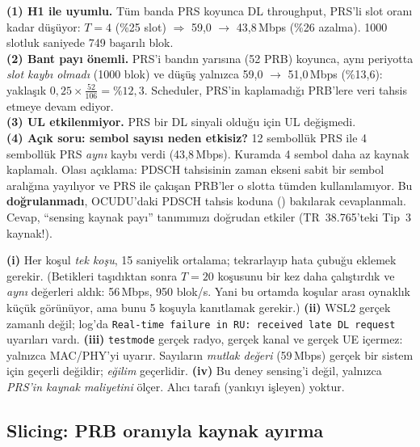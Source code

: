 \begin{bulgu}
\textbf{(1) H1 ile uyumlu.} Tüm banda PRS koyunca DL throughput, PRS'li slot oranı kadar düşüyor: $T=4$ (\%25 slot) $\Rightarrow$ 59,0 $\rightarrow$ 43,8\,Mbps (\%26 azalma). 1000 slotluk saniyede 749 başarılı blok.\\
\textbf{(2) Bant payı önemli.} PRS'i bandın yarısına (52 PRB) koyunca, aynı periyotta \emph{slot kaybı olmadı} (1000 blok) ve düşüş yalnızca 59,0 $\rightarrow$ 51,0\,Mbps (\%13,6): yaklaşık $0{,}25\times\frac{52}{106}=\%12{,}3$. Scheduler, PRS'in kaplamadığı PRB'lere veri tahsis etmeye devam ediyor.\\
\textbf{(3) UL etkilenmiyor.} PRS bir DL sinyali olduğu için UL değişmedi.\\
\textbf{(4) Açık soru: sembol sayısı neden etkisiz?} 12 sembollük PRS ile 4 sembollük PRS \emph{aynı} kaybı verdi (43,8\,Mbps). Kuramda 4 sembol daha az kaynak kaplamalı. Olası açıklama:
PDSCH tahsisinin zaman ekseni sabit bir sembol aralığına yayılıyor ve PRS ile çakışan PRB'ler o slotta tümden kullanılamıyor. Bu \textbf{doğrulanmadı}, OCUDU'daki PDSCH tahsis koduna () bakılarak cevaplanmalı.
Cevap, ``sensing kaynak payı'' tanımımızı doğrudan etkiler (TR~38.765'teki Tip~3 kaynak!).
\end{bulgu}

\begin{dikkat}
\textbf{(i)} Her koşul \emph{tek koşu}, 15 saniyelik ortalama; tekrarlayıp hata çubuğu eklemek gerekir. (Betikleri taşıdıktan sonra $T=20$ koşusunu bir kez daha çalıştırdık ve \emph{aynı} değerleri aldık: 56\,Mbps, 950 blok/s. Yani bu ortamda koşular arası oynaklık küçük görünüyor, ama bunu 5 koşuyla kanıtlamak gerekir.) \textbf{(ii)} WSL2 gerçek zamanlı değil; log'da \texttt{Real-time failure in RU: received late DL request} uyarıları vardı.
\textbf{(iii)} \texttt{testmode} gerçek radyo, gerçek kanal ve gerçek UE içermez: yalnızca MAC/PHY'yi uyarır. Sayıların \emph{mutlak değeri} (59\,Mbps) gerçek bir sistem için geçerli değildir; \emph{eğilim} geçerlidir.
\textbf{(iv)} Bu deney sensing'i değil, yalnızca \emph{PRS'in kaynak maliyetini} ölçer. Alıcı tarafı (yankıyı işleyen) yoktur.
\end{dikkat}

\subsection{Slicing: PRB oranıyla kaynak ayırma}\label{sec:slicing}

